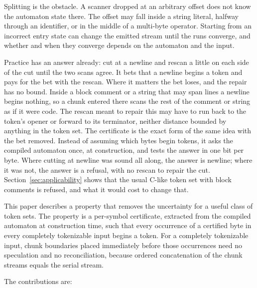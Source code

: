 \documentclass[11pt,a4paper]{article}
\theoremstyle{definition}
\theoremstyle{plain}
\begin{document}
Splitting is the obstacle. A scanner dropped at an arbitrary offset does not know the automaton state there. The offset
may fall inside a string literal, halfway through an identifier, or in the middle of a multi-byte operator. Starting
from an incorrect entry state can change the emitted stream until the runs converge, and whether and when they converge
depends on the automaton and the input.

Practice has an answer already: cut at a newline and rescan a little on each side of the cut until the two scans agree.
It bets that a newline begins a token and pays for the bet with the rescan. Where it matters the bet loses, and the
repair has no bound. Inside a block comment or a string that may span lines a newline begins nothing, so a chunk entered
there scans the rest of the comment or string as if it were code. The rescan meant to repair this may have to run back
to the token's opener or forward to its terminator, neither distance bounded by anything in the token set. The
certificate is the exact form of the same idea with the bet removed. Instead of assuming which bytes begin tokens, it
asks the compiled automaton once, at construction, and tests the answer in one bit per byte. Where cutting at newline
was sound all along, the answer is newline; where it was not, the answer is a refusal, with no rescan to repair the cut.
Section~\ref{sec:applicability} shows that the usual C-like token set with block comments is refused, and what it would
cost to change that.

This paper describes a property that removes the uncertainty for a useful class of token sets. The property is a
per-symbol certificate, extracted from the compiled automaton at construction time, such that every occurrence of a
certified byte in every completely tokenizable input begins a token. For a completely tokenizable input, chunk
boundaries placed immediately before those occurrences need no speculation and no reconciliation, because ordered
concatenation of the chunk streams equals the serial stream.

The contributions are:
\end{document}
